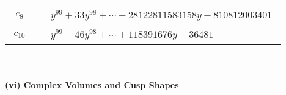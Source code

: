 \documentclass[1p]{elsarticle_modified}
\theoremstyle{definition}
\begin{document}
\begin{tabular}{m{50pt}|m{274pt}}
\hline $$\begin{aligned}c_{8}\end{aligned}$$&$\begin{aligned}
&y^{99}+33 y^{98}+\cdots-28122811583158 y-810812003401
\end{aligned}$\\
\hline $$\begin{aligned}c_{10}\end{aligned}$$&$\begin{aligned}
&y^{99}-46 y^{98}+\cdots+118391676 y-36481
\end{aligned}$\\
\hline
\end{tabular}\\~\\
\newpage\flushleft \textbf{(vi) Complex Volumes and Cusp Shapes}
\end{document}
